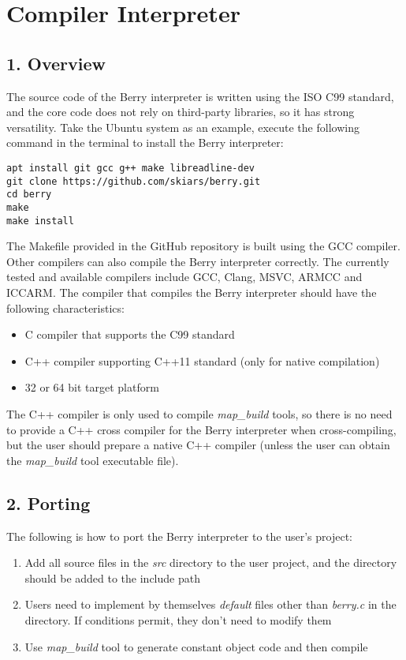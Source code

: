 \chapter {Compiler Interpreter}

\section*{1. Overview}

The source code of the Berry interpreter is written using the ISO C99 standard, and the core code does not rely on third-party libraries, so it has strong versatility. Take the Ubuntu system as an example, execute the following command in the terminal to install the Berry interpreter:
\begin{lstlisting}[numbers=none]
apt install git gcc g++ make libreadline-dev
git clone https://github.com/skiars/berry.git
cd berry
make
make install
\end{lstlisting}
The Makefile provided in the GitHub repository is built using the GCC compiler. Other compilers can also compile the Berry interpreter correctly. The currently tested and available compilers include GCC, Clang, MSVC, ARMCC and ICCARM. The compiler that compiles the Berry interpreter should have the following characteristics:
\begin{itemize}
    \item C compiler that supports the C99 standard
    \item C++ compiler supporting C++11 standard (only for native compilation)
    \item 32 or 64 bit target platform
\end{itemize}
The C++ compiler is only used to compile \textsl{map\_build} tools, so there is no need to provide a C++ cross compiler for the Berry interpreter when cross-compiling, but the user should prepare a native C++ compiler (unless the user can obtain the \textsl{map\_build} tool executable file).

\section*{2. Porting}

The following is how to port the Berry interpreter to the user's project:
\begin{enumerate}
    \item Add all source files in the \textsl{src} directory to the user project, and the directory should be added to the include path
    \item Users need to implement by themselves \textsl{default} files other than \textsl{berry.c} in the directory. If conditions permit, they don’t need to modify them
    \item Use \textsl{map\_build} tool to generate constant object code and then compile
\end{enumerate}


